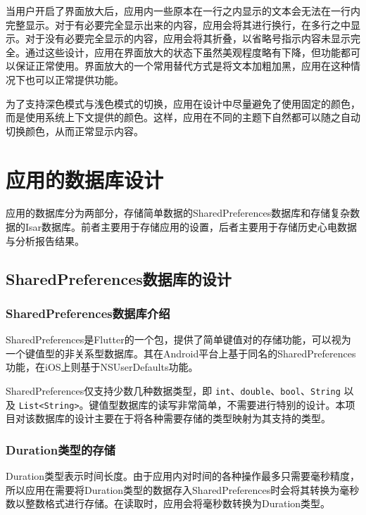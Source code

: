 当用户开启了界面放大后，应用内一些原本在一行之内显示的文本会无法在一行内完整显示。对于有必要完全显示出来的内容，应用会将其进行换行，在多行之中显示。对于没有必要完全显示的内容，应用会将其折叠，以省略号指示内容未显示完全。通过这些设计，应用在界面放大的状态下虽然美观程度略有下降，但功能都可以保证正常使用。界面放大的一个常用替代方式是将文本加粗加黑，应用在这种情况下也可以正常提供功能。

为了支持深色模式与浅色模式的切换，应用在设计中尽量避免了使用固定的颜色，而是使用系统上下文提供的颜色。这样，应用在不同的主题下自然都可以随之自动切换颜色，从而正常显示内容。


\section{应用的数据库设计}\label{sec:db-design}

应用的数据库分为两部分，存储简单数据的SharedPreferences数据库和存储复杂数据的Isar数据库。前者主要用于存储应用的设置，后者主要用于存储历史心电数据与分析报告结果。

\subsection{SharedPreferences数据库的设计}\label{subsec:shared-preferences}

\subsubsection{SharedPreferences数据库介绍}\label{subsubsec:shared-preferences-intro}

SharedPreferences是Flutter的一个包，提供了简单键值对的存储功能，可以视为一个键值型的非关系型数据库。其在Android平台上基于同名的SharedPreferences功能，在iOS上则基于NSUserDefaults功能。

SharedPreferences仅支持少数几种数据类型，即 \lstinline{int}、\lstinline{double}、\lstinline{bool}、\lstinline{String} 以及 \lstinline{List<String>}。键值型数据库的读写非常简单，不需要进行特别的设计。本项目对该数据库的设计主要在于将各种需要存储的类型映射为其支持的类型。

\subsubsection{Duration类型的存储}\label{subsubsec:duration-storage}

Duration类型表示时间长度。由于应用内对时间的各种操作最多只需要毫秒精度，所以应用在需要将Duration类型的数据存入SharedPreferences时会将其转换为毫秒数以整数格式进行存储。在读取时，应用会将毫秒数转换为Duration类型。

